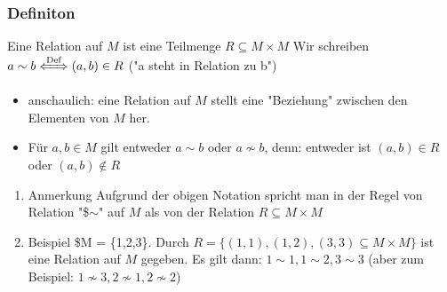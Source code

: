 \documentclass[11pt]{article}
\begin{document}
\subsubsection{Definiton}
\label{sec-2-5-1}
Eine Relation auf $M$ ist eine Teilmenge $R\subseteq M\times M$
Wir schreiben $a\sim b \xLeftrightarrow{\text{Def}} (a,b) \in R$ ("a steht in Relation zu b")

\begin{itemize}
\item anschaulich: eine Relation auf $M$ stellt eine "Beziehung" zwischen den Elementen von $M$ her.
\item Für $a,b \in M$ gilt entweder $a\sim b$ oder $a\not\sim b$, denn: entweder ist $(a,b) \in R$ oder $(a,b)\not\in R$
\end{itemize}
\begin{enumerate}
\item Anmerkung
\label{sec-2-5-1-1}
Aufgrund der obigen Notation spricht man in der Regel von Relation "\$$\sim$" auf $M$ als von der Relation $R \subseteq M\times M$
\item Beispiel
\label{sec-2-5-1-2}
\$M = \{1,2,3\}. Durch $R = \{(1,1), (1,2), (3,3) \subseteq M\times M\}$ ist eine Relation auf $M$ gegeben. Es gilt dann: $1\sim 1, 1\sim 2, 3\sim 3$ (aber zum Beispiel: $1\not\sim 3, 2\not\sim 1, 2\not\sim 2$)
\end{enumerate}
\end{document}
